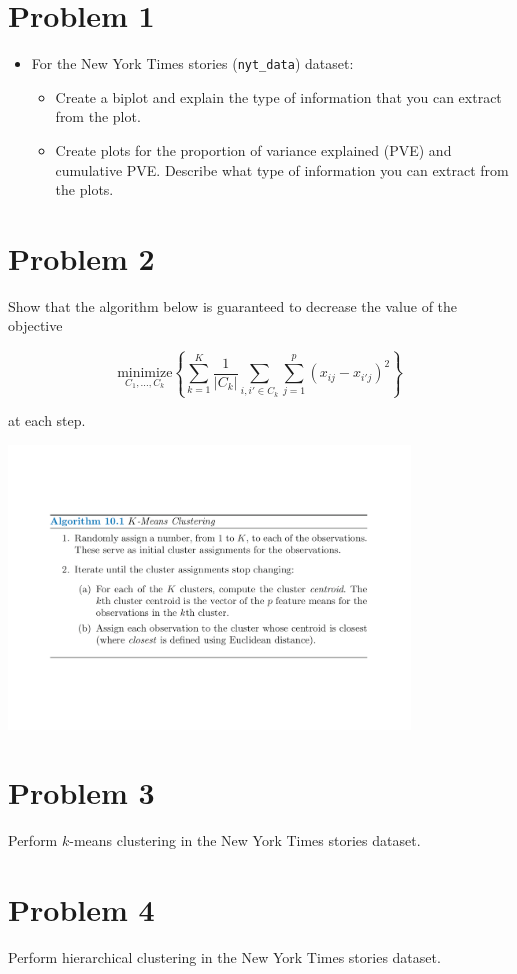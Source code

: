 \documentclass[
]{article}
\providecommand{\tightlist}{%
  \setlength{\itemsep}{0pt}\setlength{\parskip}{0pt}}
\begin{document}
\section{Problem 1}\label{problem-1}

\begin{itemize}
\tightlist
\item
  For the New York Times stories (\texttt{nyt\_data}) dataset:

  \begin{itemize}
  \tightlist
  \item
    Create a biplot and explain the type of information that you can
    extract from the plot.
  \item
    Create plots for the proportion of variance explained (PVE) and
    cumulative PVE. Describe what type of information you can extract
    from the plots.
  \end{itemize}
\end{itemize}

\section{Problem 2}\label{problem-2}

Show that the algorithm below is guaranteed to decrease the value of the
objective

\[
\underset{C_1, \ldots, C_k}{\text{minimize}}\left\{\sum_{k=1}^{K} \frac{1}{|C_k|} \sum_{i, i' \in C_k} \sum_{j=1}^{p}(x_{ij} - x_{i'j})^2 \right\}
\]

at each step.

\center

\includegraphics[width=0.8\textwidth,height=\textheight]{kmeans_algo.pdf}

\flushleft

\section{Problem 3}\label{problem-3}

Perform \(k\)-means clustering in the New York Times stories dataset.

\section{Problem 4}\label{problem-4}

Perform hierarchical clustering in the New York Times stories dataset.
\end{document}
